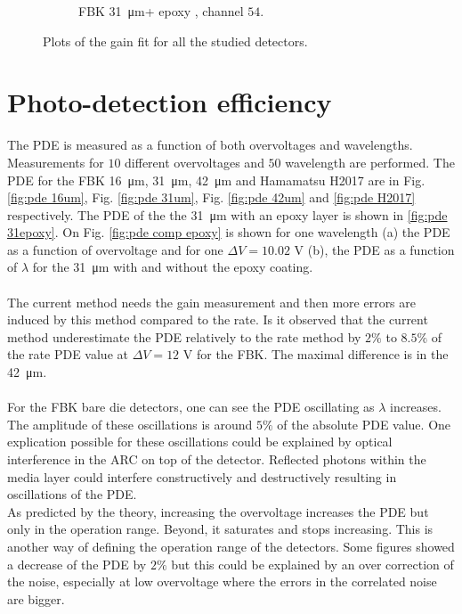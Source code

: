 \begin{figure}[htbp]
\begin{subfigure}{0.48\textwidth}
    \caption{FBK \SI{31}{\micro m}+ epoxy , channel $54$.}
    \label{fig:31 epoxy gain}
  \end{subfigure}
  \hfill
  \caption{Plots of the gain fit for all the studied detectors. }
  \label{fig:Gain fit for all detectors}
\end{figure}

\restoregeometry


\section{Photo-detection efficiency}
\label{ch:Results:PDE}
The PDE is measured as a function of both overvoltages and wavelengths. Measurements for $10$ different overvoltages and $50$ wavelength are performed. The PDE for the FBK \SI{16}{\micro m}, \SI{31}{\micro m}, \SI{42}{\micro m} and Hamamatsu H2017 are in Fig. \ref{fig:pde 16um}, Fig. \ref{fig:pde 31um}, Fig. \ref{fig:pde 42um} and \ref{fig:pde H2017} respectively. The PDE of the the \SI{31}{\micro m} with an epoxy layer is shown in \ref{fig:pde 31epoxy}.
On Fig. \ref{fig:pde comp epoxy} is shown for one wavelength (a) the PDE as a function of overvoltage and for one $\Delta V = 10.02$ V (b), the PDE as a function of $\lambda$ for the \SI{31}{\micro m} with and without the epoxy coating. \\
\\
The current method needs the gain measurement and then more errors are induced by this method compared to the rate. 
Is it observed that the current method underestimate the PDE relatively to the rate method by $2\%$ to $8.5\%$ of the rate PDE value at $\Delta V=12 $ V for the FBK. The maximal difference is in the \SI{42}{\micro m}. \\
\\
For the FBK bare die detectors, one can see the PDE oscillating as $\lambda$ increases. The amplitude of these oscillations is around $5\%$ of the absolute PDE value. 
One explication possible for these oscillations could be explained by optical interference in the \ac{ARC} on top of the detector. Reflected photons within the media layer could interfere constructively and destructively resulting in oscillations of the PDE. 
\\
As predicted by the theory, increasing the overvoltage increases the PDE but only in the operation range. Beyond, it saturates and stops increasing. This is another way of defining the operation range of the detectors. Some figures showed a decrease of the PDE by $2\%$ but this could be explained by an over correction of the noise, especially at low overvoltage where the errors in the correlated noise are bigger. 
